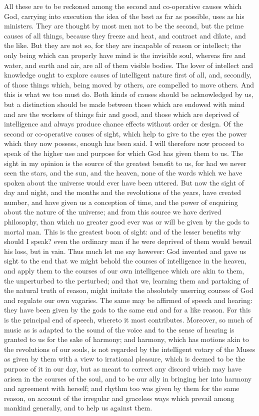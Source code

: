 \documentclass[11pt,letter]{article}
\begin{document}
\par  All these are to be reckoned among the second and co-operative causes which God, carrying into execution the idea of the best as far as possible, uses as his ministers. They are thought by most men not to be the second, but the prime causes of all things, because they freeze and heat, and contract and dilate, and the like. But they are not so, for they are incapable of reason or intellect; the only being which can properly have mind is the invisible soul, whereas fire and water, and earth and air, are all of them visible bodies. The lover of intellect and knowledge ought to explore causes of intelligent nature first of all, and, secondly, of those things which, being moved by others, are compelled to move others. And this is what we too must do. Both kinds of causes should be acknowledged by us, but a distinction should be made between those which are endowed with mind and are the workers of things fair and good, and those which are deprived of intelligence and always produce chance effects without order or design. Of the second or co-operative causes of sight, which help to give to the eyes the power which they now possess, enough has been said. I will therefore now proceed to speak of the higher use and purpose for which God has given them to us. The sight in my opinion is the source of the greatest benefit to us, for had we never seen the stars, and the sun, and the heaven, none of the words which we have spoken about the universe would ever have been uttered. But now the sight of day and night, and the months and the revolutions of the years, have created number, and have given us a conception of time, and the power of enquiring about the nature of the universe; and from this source we have derived philosophy, than which no greater good ever was or will be given by the gods to mortal man. This is the greatest boon of sight: and of the lesser benefits why should I speak? even the ordinary man if he were deprived of them would bewail his loss, but in vain. Thus much let me say however: God invented and gave us sight to the end that we might behold the courses of intelligence in the heaven, and apply them to the courses of our own intelligence which are akin to them, the unperturbed to the perturbed; and that we, learning them and partaking of the natural truth of reason, might imitate the absolutely unerring courses of God and regulate our own vagaries. The same may be affirmed of speech and hearing: they have been given by the gods to the same end and for a like reason. For this is the principal end of speech, whereto it most contributes. Moreover, so much of music as is adapted to the sound of the voice and to the sense of hearing is granted to us for the sake of harmony; and harmony, which has motions akin to the revolutions of our souls, is not regarded by the intelligent votary of the Muses as given by them with a view to irrational pleasure, which is deemed to be the purpose of it in our day, but as meant to correct any discord which may have arisen in the courses of the soul, and to be our ally in bringing her into harmony and agreement with herself; and rhythm too was given by them for the same reason, on account of the irregular and graceless ways which prevail among mankind generally, and to help us against them.
\end{document}
